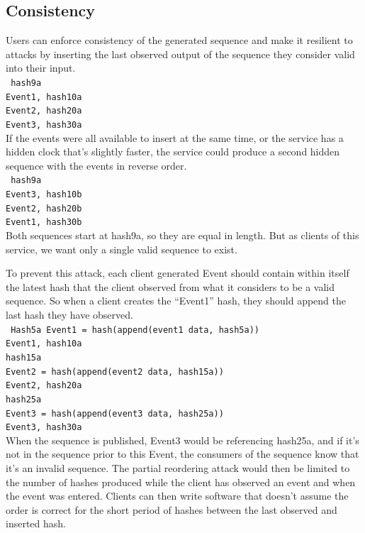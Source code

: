 \documentclass[12pt]{article}
\begin{document}
\subsection{Consistency}
Users can enforce consistency of the generated sequence and make it resilient to attacks by inserting the last observed output of the sequence they consider valid into their input.\\
\texttt{
hash9a\\
Event1, hash10a\\
Event2, hash20a\\
Event3, hash30a\\
}
If the events were all available to insert at the same time, or the service has a hidden clock that's slightly faster, the service could produce a second hidden sequence with the events in reverse order.\\
\texttt{
hash9a\\
Event3, hash10b\\
Event2, hash20b\\
Event1, hash30b\\
}
Both sequences start at hash9a, so they are equal in length. But as clients of this service, we want only a single valid sequence to exist. 

To prevent this attack, each client generated Event should contain within itself the latest hash that the client observed from what it considers to be a valid sequence. So when a client creates the “Event1” hash, they should append the last hash they have observed.\\
\texttt{
Hash5a
Event1 = hash(append(event1 data, hash5a))\\
Event1, hash10a\\
hash15a\\
Event2 = hash(append(event2 data, hash15a))\\
Event2, hash20a\\
hash25a\\
Event3 = hash(append(event3 data, hash25a))\\
Event3, hash30a\\
}
When the sequence is published, Event3 would be referencing hash25a, and if it’s not in the sequence prior to this Event, the consumers of the sequence know that it’s an invalid sequence. The partial reordering attack would then be limited to the number of hashes produced while the client has observed an event and when the event was entered. Clients can then write software that doesn’t assume the order is correct for the short period of hashes between the last observed and inserted hash.
\end{document}
